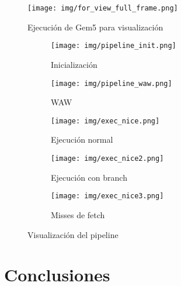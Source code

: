 \documentclass {article}
\begin{document}
\begin{figure}[ht]
  \centering
  \texttt{[image: img/for\_view\_full\_frame.png]}
  \caption{\label{fig:exec_for_viz} Ejecución de Gem5 para visualización}
\end{figure}

\begin{figure}[h]
  \centering
  \label{fig:result_viz}
  \begin{subfigure}[b]{\textwidth}
    \texttt{[image: img/pipeline\_init.png]}
    \caption{\label{fig:pipeline_init} Inicialización}
  \end{subfigure}
  
  \begin{subfigure}[b]{\textwidth}
    \texttt{[image: img/pipeline\_waw.png]}
    \caption{\label{fig:pipeline_waw} WAW}
  \end{subfigure}
  \hfill
  
  \begin{subfigure}[b]{\textwidth}
    \texttt{[image: img/exec\_nice.png]}
    \caption{\label{fig:viz} Ejecución normal}
  \end{subfigure}
  
  \begin{subfigure}[b]{\textwidth}
    \texttt{[image: img/exec\_nice2.png]}
    \caption{\label{fig:viz2} Ejecución con branch}
  \end{subfigure}
  
  \begin{subfigure}[b]{\textwidth}
    \texttt{[image: img/exec\_nice3.png]}
    \caption{\label{fig:viz3} Misses de fetch}
  \end{subfigure}
  \caption{Visualización del pipeline}
\end{figure}





\section{Conclusiones}





\end{document}
